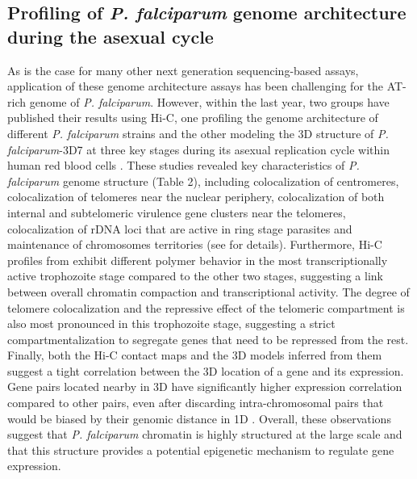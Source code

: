 \subsection{Profiling of \textit{P. falciparum} genome architecture during the asexual
cycle}

As is the case for many other next generation sequencing-based assays,
application of these genome architecture assays has been challenging for the
AT-rich genome of \textit{P. falciparum}. However, within the last year, two groups
have published their results using Hi-C, one profiling the genome architecture
of different \textit{P. falciparum} strains \citep{lemieux:genome-wide} 
and the other modeling the 3D
structure of \textit{P. falciparum}-3D7 at three key stages during its asexual
replication cycle within human red blood cells \citep{ay:three-dimensional}.
These studies revealed
key characteristics of \textit{P. falciparum} genome structure (Table 2), including
colocalization of centromeres, colocalization of telomeres near the nuclear
periphery, colocalization of both internal and subtelomeric virulence gene
clusters near the telomeres, colocalization of rDNA loci that are active in
ring stage parasites and maintenance of chromosomes territories (see
\citet{ay:three-dimensional} for details). Furthermore, Hi-C profiles from
\citet{ay:three-dimensional} exhibit different
polymer behavior in the most transcriptionally active trophozoite stage
compared to the other two stages, suggesting a link between overall chromatin
compaction and transcriptional activity. The degree of telomere colocalization
and the repressive effect of the telomeric compartment is also most pronounced
in this trophozoite stage, suggesting a strict compartmentalization to
segregate genes that need to be repressed from the rest. Finally, both the
Hi-C contact maps and the 3D models inferred from them suggest a tight
correlation between the 3D location of a gene and its expression. Gene pairs
located nearby in 3D have significantly higher expression correlation compared
to other pairs, even after discarding intra-chromosomal pairs that would be
biased by their genomic distance in 1D \citep{ay:three-dimensional}. Overall, these observations
suggest that \textit{P. falciparum} chromatin is highly structured at the large scale
and that this structure provides a potential epigenetic mechanism to regulate
gene expression.

